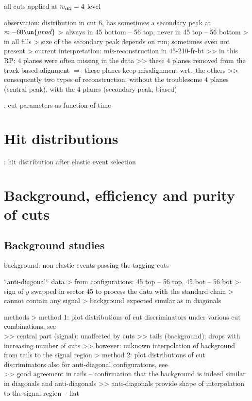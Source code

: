 \> all cuts applied at $n_\si = 4$ level

\> observation: distribution in cut 6, has sometimes a secondary peak at $\approx - 60\un{\mu rad}$
\>> always in 45 bottom -- 56 top, never in 45 top -- 56 bottom
\>> in all fills
\>> size of the secondary peak depends on run; sometimes even not present
\>> current interpretation: mis-reconstruction in 45-210-fr-bt
\>>> in this RP: 4 planes were often missing in the data
\>>> these 4 planes removed from the track-based alignment $\Rightarrow$ these planes keep misalignment wrt.~the others
\>>> consequently two types of reconstruction: without the troublesome 4 planes (central peak), with the 4 planes (secondary peak, biased)

\>  : cut parameters as function of time




\section{Hit distributions}

\> : hit distribution after elastic event selection



\section{Background, efficiency and purity of cuts}

\subsection{Background studies}

\> background: non-elastic events passing the tagging cuts

\> ``anti-diagonal`` data
\>> from configurations: 45 top -- 56 top, 45 bot -- 56 bot
\>> sign of $y$ swapped in sector 45 to process the data with the standard chain
\>> cannot contain any signal
\>> background expected similar as in diagonals

\> methods
\>> method 1: plot distributions of cut discriminators under various cut combinations, see\\ 
\>>> central part (signal): unaffected by cuts
\>>> tails (background): drops with increasing number of cuts
\>>> however: unknown interpolation of background from tails to the signal region
\>> method 2: plot distributions of cut discriminators also for anti-diagonal configurations, see\\ 
\>>> good agreement in tails -- confirmation that the background is indeed similar in diagonals and anti-diagonals
\>>> anti-diagonals provide shape of interpolation to the signal region -- flat

